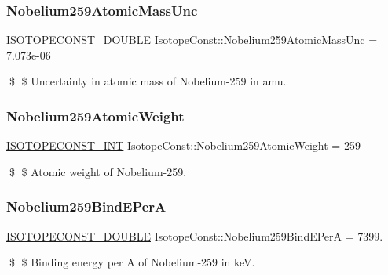 \subsubsection{\texorpdfstring{Nobelium259\+Atomic\+Mass\+Unc}{Nobelium259AtomicMassUnc}}
{\footnotesize\ttfamily \mbox{\hyperlink{group___isotope_const-_macros_ga8f45a7272ce02c0b4c65c44636ed719a}{I\+S\+O\+T\+O\+P\+E\+C\+O\+N\+S\+T\+\_\+\+D\+O\+U\+B\+LE}} Isotope\+Const\+::\+Nobelium259\+Atomic\+Mass\+Unc = 7.\+073e-\/06}

\$ \$ Uncertainty in atomic mass of Nobelium-\/259 in amu. \mbox{\label{group___isotope_const-_nobelium-_no259_ga742365b3f56ed871a6d7b6a4e02939d7}} 
\subsubsection{\texorpdfstring{Nobelium259\+Atomic\+Weight}{Nobelium259AtomicWeight}}
{\footnotesize\ttfamily \mbox{\hyperlink{group___isotope_const-_macros_ga5f18360b3e99483a35c32d789e62621c}{I\+S\+O\+T\+O\+P\+E\+C\+O\+N\+S\+T\+\_\+\+I\+NT}} Isotope\+Const\+::\+Nobelium259\+Atomic\+Weight = 259}

\$ \$ Atomic weight of Nobelium-\/259. \mbox{\label{group___isotope_const-_nobelium-_no259_gaefae8f26bf4ca2d74522f5796e4cbedd}} 
\subsubsection{\texorpdfstring{Nobelium259\+Bind\+E\+PerA}{Nobelium259BindEPerA}}
{\footnotesize\ttfamily \mbox{\hyperlink{group___isotope_const-_macros_ga8f45a7272ce02c0b4c65c44636ed719a}{I\+S\+O\+T\+O\+P\+E\+C\+O\+N\+S\+T\+\_\+\+D\+O\+U\+B\+LE}} Isotope\+Const\+::\+Nobelium259\+Bind\+E\+PerA = 7399.}

\$ \$ Binding energy per A of Nobelium-\/259 in keV. \mbox{\label{group___isotope_const-_nobelium-_no259_ga034d8f5d1708f1376ce319b53424e06e}} 

